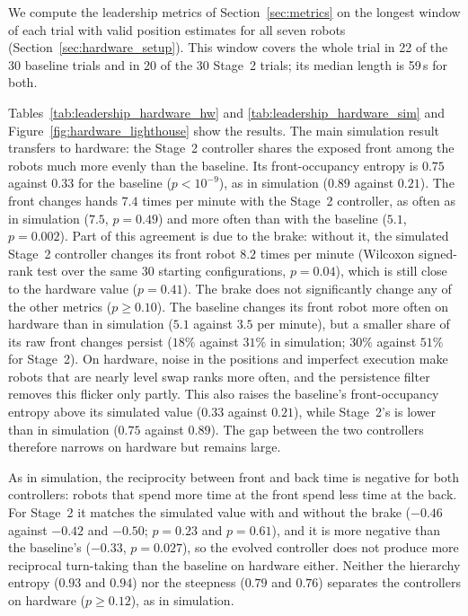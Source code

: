 \documentclass[runningheads]{llncs}
\begin{document}
We compute the leadership metrics of Section~\ref{sec:metrics} on the longest window of each trial with valid position estimates for all seven robots (Section~\ref{sec:hardware_setup}). This window covers the whole trial in 22 of the 30 baseline trials and in 20 of the 30 Stage~2 trials; its median length is 59\,s for both.

Tables~\ref{tab:leadership_hardware_hw} and \ref{tab:leadership_hardware_sim} and Figure~\ref{fig:hardware_lighthouse} show the results. The main simulation result transfers to hardware: the Stage~2 controller shares the exposed front among the robots much more evenly than the baseline. Its front-occupancy entropy is $0.75$ against $0.33$ for the baseline ($p < 10^{-9}$), as in simulation ($0.89$ against $0.21$). The front changes hands $7.4$ times per minute with the Stage~2 controller, as often as in simulation ($7.5$, $p = 0.49$) and more often than with the baseline ($5.1$, $p = 0.002$). Part of this agreement is due to the brake: without it, the simulated Stage~2 controller changes its front robot $8.2$ times per minute (Wilcoxon signed-rank test over the same 30 starting configurations, $p = 0.04$), which is still close to the hardware value ($p = 0.41$). The brake does not significantly change any of the other metrics ($p \geq 0.10$). The baseline changes its front robot more often on hardware than in simulation ($5.1$ against $3.5$ per minute), but a smaller share of its raw front changes persist ($18\%$ against $31\%$ in simulation; $30\%$ against $51\%$ for Stage~2). On hardware, noise in the positions and imperfect execution make robots that are nearly level swap ranks more often, and the persistence filter removes this flicker only partly. This also raises the baseline's front-occupancy entropy above its simulated value ($0.33$ against $0.21$), while Stage~2's is lower than in simulation ($0.75$ against $0.89$). The gap between the two controllers therefore narrows on hardware but remains large.

As in simulation, the reciprocity between front and back time is negative for both controllers: robots that spend more time at the front spend less time at the back. For Stage~2 it matches the simulated value with and without the brake ($-0.46$ against $-0.42$ and $-0.50$; $p = 0.23$ and $p = 0.61$), and it is more negative than the baseline's ($-0.33$, $p = 0.027$), so the evolved controller does not produce more reciprocal turn-taking than the baseline on hardware either. Neither the hierarchy entropy ($0.93$ and $0.94$) nor the steepness ($0.79$ and $0.76$) separates the controllers on hardware ($p \geq 0.12$), as in simulation.
\end{document}
